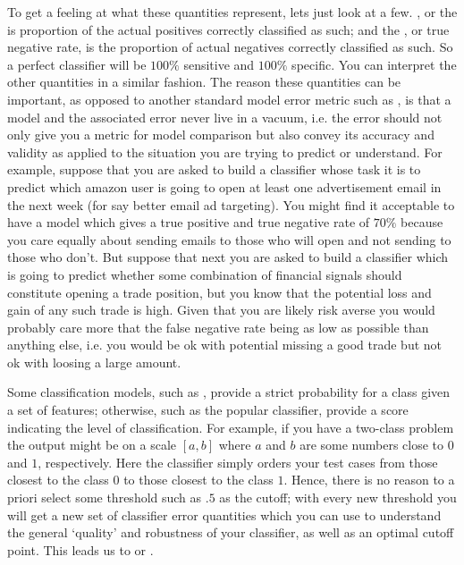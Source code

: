             To get a feeling at what these quantities represent, lets just look at a few. , or the  is proportion of the actual positives correctly classified as such; and the , or true negative rate, is the proportion of actual negatives correctly classified as such. So a perfect classifier will be $100\%$ sensitive and $100\%$ specific. You can interpret the other quantities in a similar fashion.
             The reason these quantities can be important, as opposed to another standard model error metric such as , is that a model and the associated error never live in a vacuum, i.e. the error should not only give you a metric for model comparison but also convey its accuracy and validity as applied to the situation you are trying to predict or understand. For example, suppose that you are asked to build a classifier whose task it is to predict which amazon user is going to open at least one advertisement email in the next week (for say better email ad targeting). You might find it acceptable to have a model which gives a true positive and true negative rate of $70\%$ because you care equally about sending emails to those who will open and not sending to those who don't. But suppose that next you are asked to build a classifier which is going to predict whether some combination of financial signals should constitute opening a trade position, but you know that the potential loss and gain of any such trade is high. Given that you are likely risk averse you would probably care more that the false negative rate being as low as possible than anything else, i.e. you would be ok with potential missing a good trade but not ok with loosing a large amount.

             Some classification models, such as , provide a strict probability for a class given a set of features; otherwise, such as the popular  classifier, provide a score indicating the level of classification. For example, if you have a two-class problem the output might be on a scale $[a,b]$ where $a$ and $b$ are some numbers close to $0$ and $1$, respectively. Here the classifier simply orders your test cases from those closest to the class $0$ to those closest to the class $1$. Hence, there is no reason to a priori select some threshold such as $.5$ as the cutoff; with every new threshold you will get a new set of classifier error quantities which you can use to understand the general `quality' and robustness of your classifier, as well as an optimal cutoff point. This leads us to  or . 

